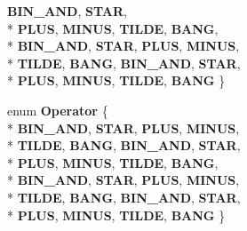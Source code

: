 \begin{DoxyCompactItemize}
{\bfseries B\-I\-N\-\_\-\-A\-N\-D}, 
{\bfseries S\-T\-A\-R}, 
\\*
{\bfseries P\-L\-U\-S}, 
{\bfseries M\-I\-N\-U\-S}, 
{\bfseries T\-I\-L\-D\-E}, 
{\bfseries B\-A\-N\-G}, 
\\*
{\bfseries B\-I\-N\-\_\-\-A\-N\-D}, 
{\bfseries S\-T\-A\-R}, 
{\bfseries P\-L\-U\-S}, 
{\bfseries M\-I\-N\-U\-S}, 
\\*
{\bfseries T\-I\-L\-D\-E}, 
{\bfseries B\-A\-N\-G}, 
{\bfseries B\-I\-N\-\_\-\-A\-N\-D}, 
{\bfseries S\-T\-A\-R}, 
\\*
{\bfseries P\-L\-U\-S}, 
{\bfseries M\-I\-N\-U\-S}, 
{\bfseries T\-I\-L\-D\-E}, 
{\bfseries B\-A\-N\-G}
 \}
\item 
enum {\bfseries Operator} \{ \\*
{\bfseries B\-I\-N\-\_\-\-A\-N\-D}, 
{\bfseries S\-T\-A\-R}, 
{\bfseries P\-L\-U\-S}, 
{\bfseries M\-I\-N\-U\-S}, 
\\*
{\bfseries T\-I\-L\-D\-E}, 
{\bfseries B\-A\-N\-G}, 
{\bfseries B\-I\-N\-\_\-\-A\-N\-D}, 
{\bfseries S\-T\-A\-R}, 
\\*
{\bfseries P\-L\-U\-S}, 
{\bfseries M\-I\-N\-U\-S}, 
{\bfseries T\-I\-L\-D\-E}, 
{\bfseries B\-A\-N\-G}, 
\\*
{\bfseries B\-I\-N\-\_\-\-A\-N\-D}, 
{\bfseries S\-T\-A\-R}, 
{\bfseries P\-L\-U\-S}, 
{\bfseries M\-I\-N\-U\-S}, 
\\*
{\bfseries T\-I\-L\-D\-E}, 
{\bfseries B\-A\-N\-G}, 
{\bfseries B\-I\-N\-\_\-\-A\-N\-D}, 
{\bfseries S\-T\-A\-R}, 
\\*
{\bfseries P\-L\-U\-S}, 
{\bfseries M\-I\-N\-U\-S}, 
{\bfseries T\-I\-L\-D\-E}, 
{\bfseries B\-A\-N\-G}
 \}
\end{DoxyCompactItemize}
